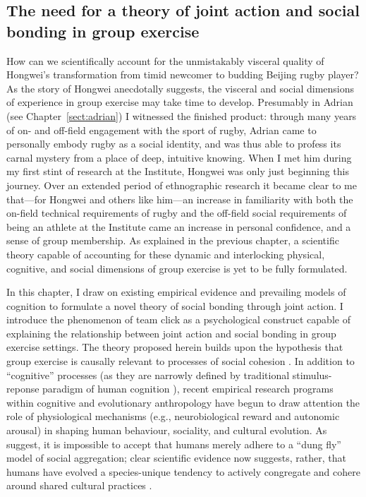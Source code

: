 \begin{CJK}{UTF8}{gbsn}
\section{The need for a theory of joint action and social bonding in group exercise}

How can we scientifically account for the unmistakably visceral quality of Hongwei's transformation from timid newcomer to budding Beijing rugby player?  As the story of Hongwei anecdotally suggests, the visceral and social dimensions of experience in group exercise may take time to develop.  Presumably in Adrian (see Chapter~\ref{sect:adrian}) I witnessed the finished product: through many years of on- and off-field engagement with the sport of rugby, Adrian came to personally embody rugby as a social identity, and was thus able to profess its carnal mystery from a place of deep, intuitive knowing.  When I met him during my first stint of research at the Institute, Hongwei was only just beginning this journey.  Over an extended period of ethnographic research it became clear to me that---for Hongwei and others like him---an increase in familiarity with both the on-field technical requirements of rugby and the off-field social requirements of being an athlete at the Institute came an increase in personal confidence, and a sense of group membership.  As explained in the previous chapter, a scientific theory capable of accounting for these dynamic and interlocking physical, cognitive, and social dimensions of group exercise is yet to be fully formulated.

In this chapter, I draw on existing empirical evidence and prevailing models of cognition to formulate a novel theory of social bonding through joint action.  I introduce the phenomenon of team click as a psychological construct capable of explaining the relationship between joint action and social bonding in group exercise settings.  The theory proposed herein builds upon the hypothesis that group exercise is causally relevant to processes of social cohesion \citep{Dunbar2010,Whitehouse2014,Cohen2017}. In addition to ``cognitive'' processes (as they are narrowly defined by traditional stimulus-reponse paradigm of human cognition \citep[e.g.][]{Marr1985}), recent empirical research programs within cognitive and evolutionary anthropology have begun to draw attention the role of physiological mechanisms (e.g., neurobiological reward and autonomic arousal) in shaping human behaviour, sociality, and cultural evolution.  As \textcite{Dunbar2010} suggest, it is impossible to accept that humans merely adhere to a ``dung fly'' model of social aggregation; clear scientific evidence now suggests, rather, that humans have evolved a species-unique tendency to actively congregate and cohere around shared cultural practices \citep[see][]{Tomasello2005}.


\end{CJK}
